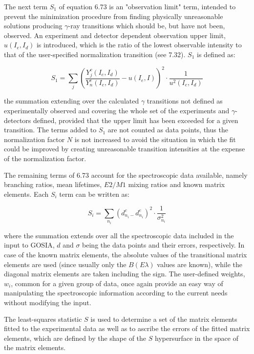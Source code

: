 \documentclass[10pt]{article}
\begin{document}
The next term $S_{1}$ of equation 6.73 is an "observation limit" term, intended to prevent the minimization procedure from finding physically unreasonable solutions producing $\gamma$-ray transitions which should be, but have not been, observed. An experiment and detector dependent observation upper limit, $u\left(I_{e}, I_{d}\right)$ is introduced, which is the ratio of the lowest observable intensity to that of the user-specified normalization transition (see 7.32). $S_{1}$ is defined as:


\begin{equation*}
S_{1}=\sum_{j}\left(\frac{Y_{j}^{c}\left(I_{e}, I_{d}\right)}{Y_{n}^{c}\left(I_{e}, I_{d}\right)}-u\left(I_{e}, I\right)\right)^{2} \cdot \frac{1}{u^{2}\left(I_{e}, I_{d}\right)} \tag{6.79}
\end{equation*}


the summation extending over the calculated $\gamma$ transitions not defined as experimentally observed and covering the whole set of the experiments and $\gamma$-detectors defined, provided that the upper limit has been exceeded for a given transition. The terms added to $S_{1}$ are not counted as data points, thus the normalization factor $N$ is not increased to avoid the situation in which the fit could be improved by creating unreasonable transition intensities at the expense of the normalization factor.

The remaining terms of 6.73 account for the spectroscopic data available, namely branching ratios, mean lifetimes, $E 2 / M 1$ mixing ratios and known matrix elements. Each $S_{i}$ term can be written as:


\begin{equation*}
S_{i}=\sum_{n_{i}}\left(d_{n_{i}-}^{c} d_{n_{i}}^{e}\right)^{2} \cdot \frac{1}{\sigma_{n_{i}}^{2}} \tag{6.80}
\end{equation*}


where the summation extends over all the spectroscopic data included in the input to GOSIA, $d$ and $\sigma$ being the data points and their errors, respectively. In case of the known matrix elements, the absolute values of the transitional matrix elements are used (since usually only the $B(E \lambda)$ values are known), while the diagonal matrix elements are taken including the sign. The user-defined weights, $w_{i}$, common for a given group of data, once again provide an easy way of manipulating the spectroscopic information according to the current needs without modifying the input.

The least-squares statistic $S$ is used to determine a set of the matrix elements fitted to the experimental data as well as to ascribe the errors of the fitted matrix elements, which are defined by the shape of the $S$ hypersurface in the space of the matrix elements.
\end{document}
